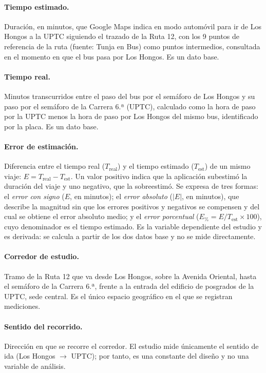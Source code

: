 \paragraph{Tiempo estimado.}
Duración, en minutos, que Google Maps indica en modo automóvil para ir de Los Hongos a la UPTC siguiendo el trazado de la Ruta 12, con los 9 puntos de referencia de la ruta (fuente: Tunja en Bus) como puntos intermedios, consultada en el momento en que el bus pasa por Los Hongos. Es un dato base.

\paragraph{Tiempo real.}
Minutos transcurridos entre el paso del bus por el semáforo de Los Hongos y su paso por el semáforo de la Carrera 6.ª (UPTC), calculado como la hora de paso por la UPTC menos la hora de paso por Los Hongos del mismo bus, identificado por la placa. Es un dato base.

\paragraph{Error de estimación.}
Diferencia entre el tiempo real ($T_{\mathrm{real}}$) y el tiempo estimado ($T_{\mathrm{est}}$) de un mismo viaje: $E = T_{\mathrm{real}} - T_{\mathrm{est}}$. Un valor positivo indica que la aplicación subestimó la duración del viaje y uno negativo, que la sobreestimó. Se expresa de tres formas: el \emph{error con signo} ($E$, en minutos); el \emph{error absoluto} ($\lvert E \rvert$, en minutos), que describe la magnitud sin que los errores positivos y negativos se compensen y del cual se obtiene el error absoluto medio; y el \emph{error porcentual} ($E_{\%} = E / T_{\mathrm{est}} \times 100$), cuyo denominador es el tiempo estimado. Es la variable dependiente del estudio y es derivada: se calcula a partir de los dos datos base y no se mide directamente.

\paragraph{Corredor de estudio.}
Tramo de la Ruta 12 que va desde Los Hongos, sobre la Avenida Oriental, hasta el semáforo de la Carrera 6.ª, frente a la entrada del edificio de posgrados de la UPTC, sede central. Es el único espacio geográfico en el que se registran mediciones.

\paragraph{Sentido del recorrido.}
Dirección en que se recorre el corredor. El estudio mide únicamente el sentido de ida (Los Hongos $\rightarrow$ UPTC); por tanto, es una constante del diseño y no una variable de análisis.

